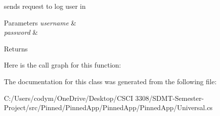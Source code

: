 sends request to log user in 


\begin{DoxyParams}{Parameters}
{\em username} & \\
\hline
{\em password} & \\
\hline
\end{DoxyParams}
\begin{DoxyReturn}{Returns}

\end{DoxyReturn}
Here is the call graph for this function\+:


The documentation for this class was generated from the following file\+:\begin{DoxyCompactItemize}
\item 
C\+:/\+Users/codym/\+One\+Drive/\+Desktop/\+C\+S\+C\+I 3308/\+S\+D\+M\+T-\/\+Semester-\/\+Project/src/\+Pinned/\+Pinned\+App/\+Pinned\+App/\+Pinned\+App/Universal.\+cs\end{DoxyCompactItemize}
